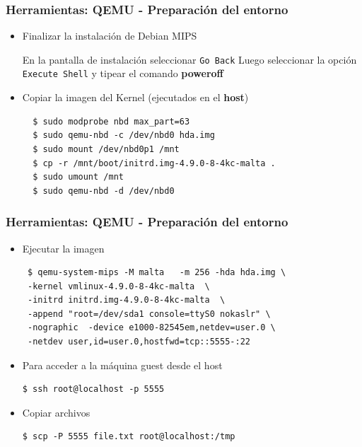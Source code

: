 \documentclass{beamer}
\begin{document}
 \begin{frame}[fragile]
 \frametitle{Herramientas: QEMU - Preparación del entorno}
 \begin{itemize}
  \item Finalizar la instalación de Debian MIPS
  
  En la pantalla de instalación seleccionar \texttt{Go Back} Luego seleccionar la opción \texttt{Execute Shell} y tipear el comando \textbf{poweroff}
  
 \item Copiar la imagen del Kernel (ejecutados en el \textbf{host})
\begin{lstlisting} 
  $ sudo modprobe nbd max_part=63
  $ sudo qemu-nbd -c /dev/nbd0 hda.img 
  $ sudo mount /dev/nbd0p1 /mnt
  $ cp -r /mnt/boot/initrd.img-4.9.0-8-4kc-malta .
  $ sudo umount /mnt 
  $ sudo qemu-nbd -d /dev/nbd0
\end{lstlisting}

\end{itemize}
  \end{frame}

  \begin{frame}[fragile]
 \frametitle{Herramientas: QEMU - Preparación del entorno} 
 \begin{itemize}
  \item Ejecutar la imagen
\begin{lstlisting}
 $ qemu-system-mips -M malta   -m 256 -hda hda.img \
 -kernel vmlinux-4.9.0-8-4kc-malta  \
 -initrd initrd.img-4.9.0-8-4kc-malta  \
 -append "root=/dev/sda1 console=ttyS0 nokaslr" \
 -nographic  -device e1000-82545em,netdev=user.0 \
 -netdev user,id=user.0,hostfwd=tcp::5555-:22
\end{lstlisting}
\item Para acceder a la máquina guest desde el host
\begin{lstlisting}
$ ssh root@localhost -p 5555
\end{lstlisting}

\item Copiar archivos
\begin{lstlisting}
$ scp -P 5555 file.txt root@localhost:/tmp
\end{lstlisting}

\end{itemize}
  \end{frame}
  
\end{document}
